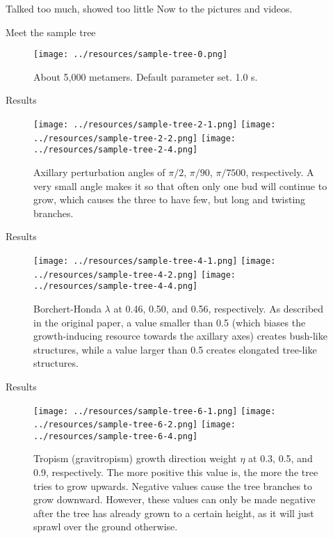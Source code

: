 \documentclass{beamer}
\begin{document}
\begin{frame}{Talked too much, showed too little}
Now to the pictures and videos.
\end{frame}


\begin{frame}{Meet the sample tree}
\begin{figure}
\texttt{[image: ../resources/sample-tree-0.png]}
\caption{About 5,000 metamers. Default parameter set. 1.0 s.}
\end{figure}
\end{frame}


\begin{frame}{Results}
\begin{figure}[H]
\centering
\texttt{[image: ../resources/sample-tree-2-1.png]}
\texttt{[image: ../resources/sample-tree-2-2.png]}
\texttt{[image: ../resources/sample-tree-2-4.png]}
\caption{Axillary perturbation angles of \(\pi / 2\), \(\pi / 90\), \(\pi / 7500\), respectively. A very small angle makes it so that often only one bud will continue to grow, which causes the three to have few, but long and twisting branches.}
\end{figure}
\end{frame}


\begin{frame}{Results}
\begin{figure}[H]
\centering
\texttt{[image: ../resources/sample-tree-4-1.png]}
\texttt{[image: ../resources/sample-tree-4-2.png]}
\texttt{[image: ../resources/sample-tree-4-4.png]}
\caption{Borchert-Honda \(\lambda\) at 0.46, 0.50, and 0.56, respectively. As described in the original paper, a value smaller than 0.5 (which biases the growth-inducing resource towards the axillary axes) creates bush-like structures, while a value larger than 0.5 creates elongated tree-like structures.}
\end{figure}
\end{frame}


\begin{frame}{Results}
\begin{figure}[H]
\centering
\texttt{[image: ../resources/sample-tree-6-1.png]}
\texttt{[image: ../resources/sample-tree-6-2.png]}
\texttt{[image: ../resources/sample-tree-6-4.png]}
\caption{Tropism (gravitropism) growth direction weight \(\eta\) at 0.3, 0.5, and 0.9, respectively. The more positive this value is, the more the tree tries to grow upwards. Negative values cause the tree branches to grow downward. However, these values can only be made negative after the tree has already grown to a certain height, as it will just sprawl over the ground otherwise.}
\end{figure}
\end{frame}
\end{document}
